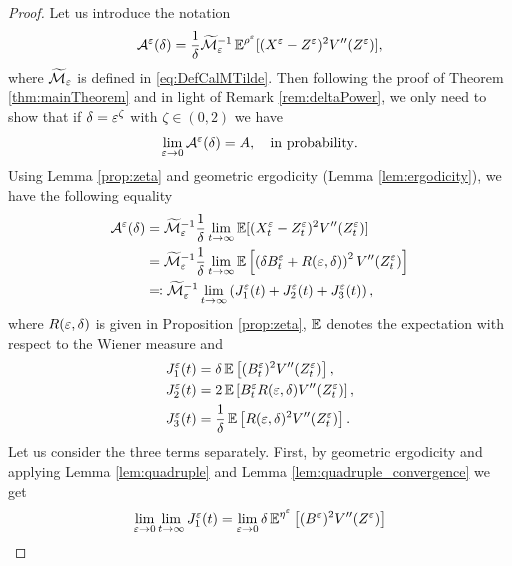 \documentclass[10pt]{article}
\begin{document}
\begin{proof}
	Let us introduce the notation
	\begin{equation}
	\mathcal A^\varepsilon(\delta) = \frac1\delta \widetilde{\mathcal M}_\varepsilon^{-1} \operatorname{\mathbb{E}}^{\rho^\varepsilon}[(X^\varepsilon - Z^\varepsilon)^2 V''(Z^\varepsilon)],
	\end{equation}
	where $\widetilde{\mathcal M}_\varepsilon$ is defined in \eqref{eq:DefCalMTilde}.	Then following the proof of Theorem \ref{thm:mainTheorem} and in light of Remark \ref{rem:deltaPower}, we only need to show that if $\delta = \varepsilon^\zeta$ with $\zeta \in (0,2)$ we have
	\begin{equation}
	\lim_{\varepsilon \to 0} \mathcal A^\varepsilon(\delta) = A, \quad \text{in probability}.
	\end{equation}
	Using Lemma \ref{prop:zeta} and geometric ergodicity (Lemma \ref{lem:ergodicity}), we have the following equality
	\begin{equation}
	\begin{aligned}
	\mathcal A^\varepsilon(\delta) &= \widetilde{\mathcal M}_\varepsilon^{-1} \frac1\delta \lim_{t \to \infty} \operatorname{\mathbb{E}} [(X_t^\varepsilon - Z_t^\varepsilon)^2 V''(Z_t^\varepsilon)] \\
	&= \widetilde{\mathcal M}_\varepsilon^{-1} \frac1\delta \lim_{t \to \infty} \operatorname{\mathbb{E}} \left[ \left( \delta B_t^\varepsilon + R(\varepsilon,\delta) \right)^2 V''(Z_t^\varepsilon) \right] \\
	&\eqqcolon \widetilde{\mathcal M}_\varepsilon^{-1} \lim_{t \to \infty} \left( J_1^\varepsilon(t) + J_2^\varepsilon(t) + J_3^\varepsilon(t) \right),
	\end{aligned}
	\end{equation}
	where $R(\varepsilon, \delta)$ is given in Proposition \ref{prop:zeta}, $\operatorname{\mathbb{E}}$ denotes the expectation with respect to the Wiener measure and
	\begin{equation}
	\begin{aligned}
	J_1^\varepsilon(t) &= \delta \operatorname{\mathbb{E}} \left[ (B_t^\varepsilon)^2 V''(Z_t^\varepsilon) \right], \\
	J_2^\varepsilon(t) &= 2 \operatorname{\mathbb{E}} \left[ B_t^\varepsilon R(\varepsilon,\delta) V''(Z_t^\varepsilon) \right], \\
	J_3^\varepsilon(t) &= \frac1\delta \operatorname{\mathbb{E}}\left[ R(\varepsilon,\delta)^2 V''(Z_t^\varepsilon) \right].
	\end{aligned}
	\end{equation}
	Let us consider the three terms separately. First, by geometric ergodicity and applying Lemma \ref{lem:quadruple} and Lemma \ref{lem:quadruple_convergence} we get
	\begin{equation}
	\begin{aligned}
	\lim_{\epl \to 0} \lim_{t \to \infty} J_1^\epl(t) &= \lim_{\epl \to 0}\delta \E^{\eta^\epl} \left[ (B^\epl)^2 V''(Z^\epl) \right] \\

\end{aligned}
\end{equation}
\end{proof}
\end{document}
